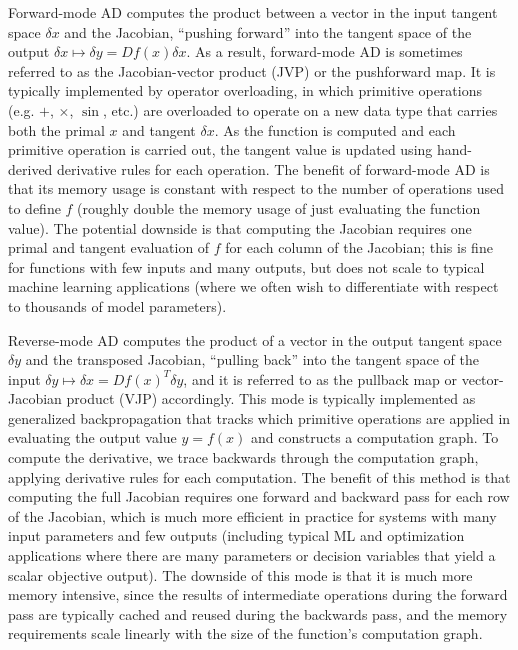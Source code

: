 Forward-mode AD computes the product between a vector in the input tangent space $\delta x$ and the Jacobian, ``pushing forward'' into the tangent space of the output $\delta x \mapsto \delta y = Df(x) \delta x$. As a result, forward-mode AD is sometimes referred to as the Jacobian-vector product (JVP) or the pushforward map. It is typically implemented by operator overloading, in which primitive operations (e.g. $+$, $\times$, $\sin$, etc.) are overloaded to operate on a new data type that carries both the primal $x$ and tangent $\delta x$. As the function is computed and each primitive operation is carried out, the tangent value is updated using hand-derived derivative rules for each operation. The benefit of forward-mode AD is that its memory usage is constant with respect to the number of operations used to define $f$ (roughly double the memory usage of just evaluating the function value). The potential downside is that computing the Jacobian requires one primal and tangent evaluation of $f$ for each column of the Jacobian; this is fine for functions with few inputs and many outputs, but does not scale to typical machine learning applications (where we often wish to differentiate with respect to thousands of model parameters).

Reverse-mode AD computes the product of a vector in the output tangent space $\delta y$ and the transposed Jacobian, ``pulling back'' into the tangent space of the input $\delta y \mapsto \delta x = Df(x)^T \delta y$, and it is referred to as the pullback map or vector-Jacobian product (VJP) accordingly. This mode is typically implemented as generalized backpropagation that tracks which primitive operations are applied in evaluating the output value $y = f(x)$ and constructs a computation graph. To compute the derivative, we trace backwards through the computation graph, applying derivative rules for each computation. The benefit of this method is that computing the full Jacobian requires one forward and backward pass for each row of the Jacobian, which is much more efficient in practice for systems with many input parameters and few outputs (including typical ML and optimization applications where there are many parameters or decision variables that yield a scalar objective output). The downside of this mode is that it is much more memory intensive, since the results of intermediate operations during the forward pass are typically cached and reused during the backwards pass, and the memory requirements scale linearly with the size of the function's computation graph.

